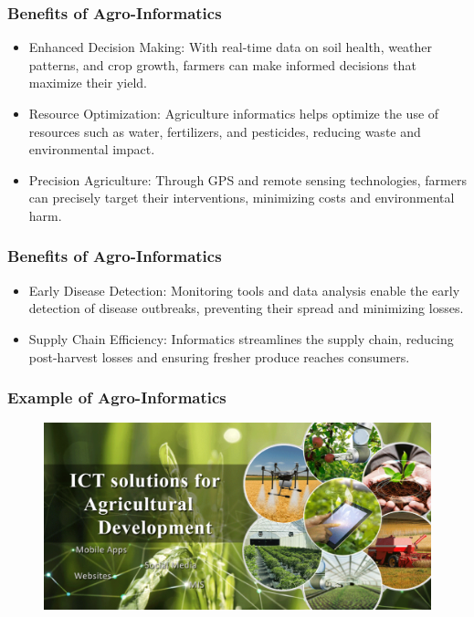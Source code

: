 \documentclass[
	11pt, %
]{beamer}
\begin{document}
\begin{frame}
	\frametitle{Benefits of Agro-Informatics}
	\begin{itemize}
		\item Enhanced Decision Making: With real-time data on soil health, weather patterns, and crop growth, farmers can make informed decisions that maximize their yield.
		\item Resource Optimization: Agriculture informatics helps optimize the use of resources such as water, fertilizers, and pesticides, reducing waste and environmental impact.
		\item Precision Agriculture: Through GPS and remote sensing technologies, farmers can precisely target their interventions, minimizing costs and environmental harm.
	\end{itemize}
\end{frame}

\begin{frame}
	\frametitle{Benefits of Agro-Informatics}
	\begin{itemize}
		\item Early Disease Detection: Monitoring tools and data analysis enable the early detection of disease outbreaks, preventing their spread and minimizing losses.
		\item Supply Chain Efficiency: Informatics streamlines the supply chain, reducing post-harvest losses and ensuring fresher produce reaches consumers.
	\end{itemize}
\end{frame}

\begin{frame}
	\frametitle{Example of Agro-Informatics}
	\begin{figure}
		\includegraphics[width=0.8\linewidth]{images/figure1.png}
		\label{fig:https://doa.gov.lk/ict-solutions/}
	\end{figure}
\end{frame}
\end{document}
